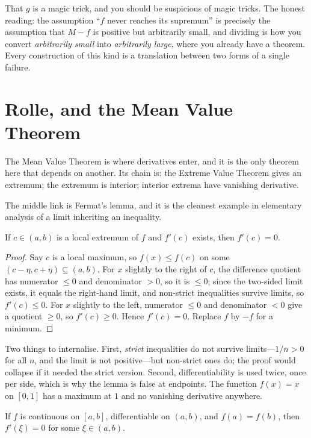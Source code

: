 \documentclass{essay}
\begin{document}
That $g$ is a magic trick, and you should be suspicious of magic tricks. The honest reading: the assumption ``$f$ never reaches its supremum'' is precisely the assumption that $M - f$ is positive but arbitrarily small, and dividing is how you convert \emph{arbitrarily small} into \emph{arbitrarily large}, where you already have a theorem. Every construction of this kind is a translation between two forms of a single failure.

\section{Rolle, and the Mean Value Theorem}

The Mean Value Theorem is where derivatives enter, and it is the only theorem here that depends on another. Its chain is: the Extreme Value Theorem gives an extremum; the extremum is interior; interior extrema have vanishing derivative.

The middle link is Fermat's lemma, and it is the cleanest example in elementary analysis of a limit inheriting an inequality.

\begin{lemma}\label{lem:fermat}
If $c \in (a,b)$ is a local extremum of $f$ and $f'(c)$ exists, then $f'(c) = 0$.
\end{lemma}

\begin{proof}
Say $c$ is a local maximum, so $f(x) \leq f(c)$ on some $(c - \eta, c + \eta) \subseteq (a,b)$. For $x$ slightly to the right of $c$, the difference quotient has numerator $\leq 0$ and denominator $> 0$, so it is $\leq 0$; since the two-sided limit exists, it equals the right-hand limit, and non-strict inequalities survive limits, so $f'(c) \leq 0$. For $x$ slightly to the left, numerator $\leq 0$ and denominator $< 0$ give a quotient $\geq 0$, so $f'(c) \geq 0$. Hence $f'(c) = 0$. Replace $f$ by $-f$ for a minimum.
\end{proof}

Two things to internalise. First, \emph{strict} inequalities do not survive limits---$1/n > 0$ for all $n$, and the limit is not positive---but non-strict ones do; the proof would collapse if it needed the strict version. Second, differentiability is used twice, once per side, which is why the lemma is false at endpoints. The function $f(x) = x$ on $[0,1]$ has a maximum at $1$ and no vanishing derivative anywhere.

\begin{theorem}[Rolle]\label{thm:rolle}
If $f$ is continuous on $[a,b]$, differentiable on $(a,b)$, and $f(a) = f(b)$, then $f'(\xi) = 0$ for some $\xi \in (a,b)$.
\end{theorem}
\end{document}
